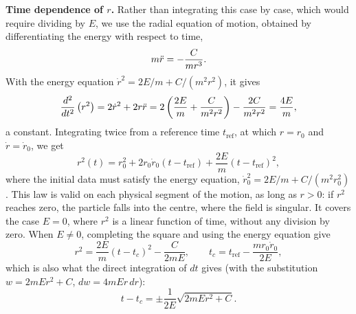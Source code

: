 \begin{problem}[title={Motion in an inverse-cube attractive force}]
{\vspace{2ex}\textbf{Time dependence of $r$.} Rather than integrating this case by case, which would require dividing by $E$, we use the radial equation of motion, obtained by differentiating the energy with respect to time,
\begin{equation*}
    m\Ddot{r} = -\frac{C}{mr^3}.
\end{equation*}
With the energy equation $\Dot{r}^2 = 2E/m + C/(m^2r^2)$, it gives
\begin{equation*}
    \frac{d^2}{dt^2}\left(r^2\right) = 2\Dot{r}^2 + 2r\Ddot{r} = 2\left(\frac{2E}{m}+\frac{C}{m^2r^2}\right) - \frac{2C}{m^2r^2} = \frac{4E}{m},
\end{equation*}
a constant. Integrating twice from a reference time $t_{\text{ref}}$, at which $r = r_0$ and $\Dot{r} = \Dot{r}_0$, we get
\begin{equation} \label{S15P2_r2}
    r^2(t) = r_0^2 + 2r_0\Dot{r}_0\left(t-t_{\text{ref}}\right) + \frac{2E}{m}\left(t-t_{\text{ref}}\right)^2,
\end{equation}
where the initial data must satisfy the energy equation, $\Dot{r}_0^2 = 2E/m + C/(m^2r_0^2)$. This law is valid on each physical segment of the motion, \ie as long as $r>0$: if $r^2$ reaches zero, the particle falls into the centre, where the field is singular. It covers the case $E=0$, where $r^2$ is a linear function of time, without any division by zero. When $E \neq 0$, completing the square and using the energy equation give
\begin{equation*}
    r^2 = \frac{2E}{m}\left(t-t_c\right)^2 - \frac{C}{2mE},
    \qquad t_c = t_{\text{ref}} - \frac{mr_0\Dot{r}_0}{2E},
\end{equation*}
which is also what the direct integration of $dt$ gives (with the substitution $w = 2mEr^2 + C$, $dw = 4mEr\,dr$):
\begin{equation*}
    t - t_c = \pm\frac{1}{2E}\sqrt{2mEr^2+C} .
\end{equation*}

}
\end{problem}
